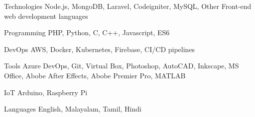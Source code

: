 

\begin{cvskills}

  \cvskill
    {Technologies} %
    {Node.js, MongoDB, Laravel, Codeigniter, MySQL, Other Front-end web development languages} %

  \cvskill
    {Programming} %
    {PHP, Python, C, C++, Javascript, ES6} %

  \cvskill
    {DevOps} %
    {AWS, Docker, Kubernetes, Firebase, CI/CD pipelines} %

  \cvskill
    {Tools} %
    {Azure DevOps, Git, Virtual Box, Photoshop, AutoCAD, Inkscape, MS Office, Abobe After Effects, Abobe Premier Pro, MATLAB} %

  \cvskill
    {IoT} %
    {Arduino, Raspberry Pi} %

  \cvskill
    {Languages} %
    {English, Malayalam, Tamil, Hindi} %

\end{cvskills}